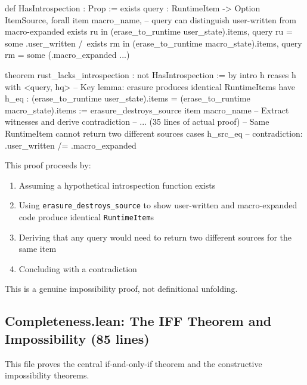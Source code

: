 \begin{code}
def HasIntrospection : Prop :=
  exists query : RuntimeItem -> Option ItemSource,
    forall item macro_name, -- query can distinguish user-written from macro-expanded
      exists ru in (erase_to_runtime user_state).items, query ru = some .user_written /\
      exists rm in (erase_to_runtime macro_state).items, query rm = some (.macro_expanded ...)

theorem rust_lacks_introspection : not HasIntrospection := by
  intro h
  rcases h with <query, hq>
  -- Key lemma: erasure produces identical RuntimeItems
  have h_eq : (erase_to_runtime user_state).items =
              (erase_to_runtime macro_state).items :=
    erasure_destroys_source item macro_name
  -- Extract witnesses and derive contradiction
  -- ... (35 lines of actual proof)
  -- Same RuntimeItem cannot return two different sources
  cases h_src_eq  -- contradiction: .user_written /= .macro_expanded
\end{code}

This proof proceeds by:
\begin{enumerate}
\item Assuming a hypothetical introspection function exists
\item Using \texttt{erasure\_destroys\_source} to show user-written and macro-expanded code produce identical \texttt{RuntimeItem}s
\item Deriving that any query would need to return two different sources for the same item
\item Concluding with a contradiction
\end{enumerate}

This is a genuine impossibility proof, not definitional unfolding.

\subsection{Completeness.lean: The IFF Theorem and Impossibility (85 lines)}\label{sec:lean-completeness}

This file proves the central if-and-only-if theorem and the constructive impossibility theorems.

